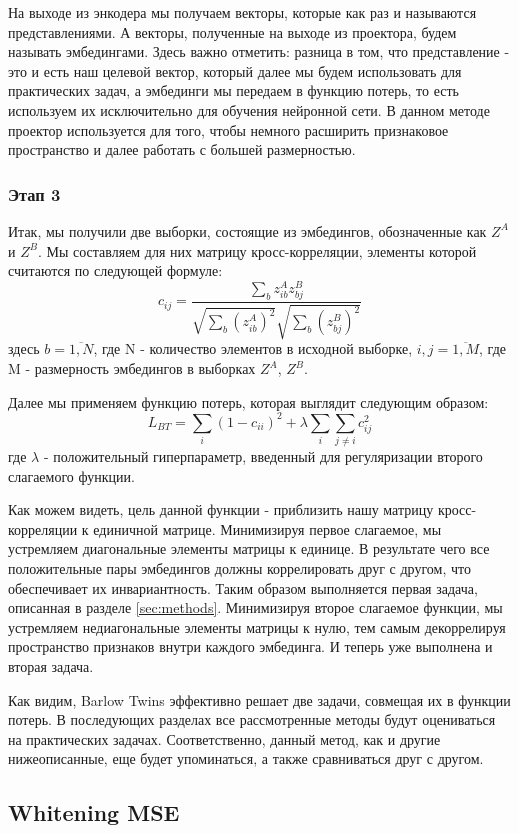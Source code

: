 На выходе из энкодера мы получаем векторы, которые как раз и называются представлениями. А векторы, полученные на выходе из проектора, будем называть эмбедингами. Здесь важно отметить: разница в том, что представление - это и есть наш целевой вектор, который далее мы будем использовать для практических задач, а эмбединги мы передаем в функцию потерь, то есть используем их исключительно для обучения нейронной сети. В данном методе проектор используется для того, чтобы немного расширить признаковое пространство и далее работать с большей размерностью.

\subsubsection{Этап 3}

Итак, мы получили две выборки, состоящие из эмбедингов, обозначенные как $Z^A$ и $Z^B$. Мы составляем для них матрицу кросс-корреляции, элементы которой считаются по следующей формуле: 
$$
c_{ij}=\frac{\sum_b z_{ib}^A z_{bj}^B}
{\sqrt{\sum_b (z_{ib}^A)^2} \sqrt{\sum_b (z_{bj}^B)^2}}
$$
здесь $b=\overline{1,N}$, где N - количество элементов в исходной выборке, $i, j=\overline{1,M}$, где M - размерность эмбедингов в выборках $Z^A$, $Z^B$.

Далее мы применяем функцию потерь, которая выглядит следующим образом:
$$
L_{BT}=\sum_{i}(1-c_{ii})^2+\lambda\sum_{i}\sum_{j\neq i}c_{ij}^2
$$
где $\lambda$ - положительный гиперпараметр, введенный для регуляризации второго слагаемого функции.

Как можем видеть, цель данной функции - приблизить нашу матрицу кросс-корреляции к единичной матрице. Минимизируя первое слагаемое, мы устремляем диагональные элементы матрицы к единице. В результате чего все положительные пары эмбедингов должны коррелировать друг с другом, что обеспечивает их инвариантность. Таким образом выполняется первая задача, описанная в разделе \ref{sec:methods}. Минимизируя второе слагаемое функции, мы устремляем недиагональные элементы матрицы к нулю, тем самым декоррелируя пространство признаков внутри каждого эмбединга. И теперь уже выполнена и вторая задача.

Как видим, Barlow Twins эффективно решает две задачи, совмещая их в функции потерь. В последующих разделах все рассмотренные методы будут оцениваться на практических задачах. Соответственно, данный метод, как и другие нижеописанные, еще будет упоминаться, а также сравниваться друг с другом.

\subsection{Whitening MSE}

